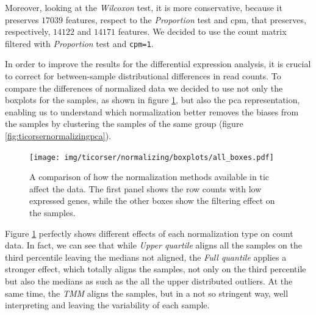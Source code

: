 Moreover, looking at the \textit{Wilcoxon} test, it is more conservative, because it preserves $17039$ features, respect to the \textit{Proportion} test and \gls{cpm}, that preserves, respectively, $14122$ and $14171$ features.
We decided to use the count matrix filtered with \textit{Proportion} test and \lstinline!cpm=1!.  

In order to improve the results for the differential expression analysis, it is crucial to correct for between-sample distributional differences in read counts.
To compare the differences of normalized data we decided to use not only the boxplots for the samples, as shown in  figure \ref{fig:ticorsernormalizingbox}, but also the \gls{pca} representation, enabling us to understand which normalization better removes the biases from the samples by clustering the samples of the same group (figure \ref{fig:ticorsernormalizingpca}).

\begin{figure}[H]
\texttt{[image: img/ticorser/normalizing/boxplots/all\_boxes.pdf]}
\caption[ticorser normalizing boxplots]{A comparison of how the normalization methods available in \gls{tic} affect the data.
The first panel shows the row counts with low expressed genes, while the other boxes show the filtering effect on the samples.}
\label{fig:ticorsernormalizingbox}
\centering
\end{figure}

Figure \ref{fig:ticorsernormalizingbox} perfectly shows different effects of each normalization type on count data.  
In fact, we can see that while \textit{Upper quartile} aligns all the samples on the third percentile leaving the medians not aligned, the \textit{Full quantile} applies a stronger effect, which totally aligns the samples, not only on the third percentile but also the medians as such as the all the upper distributed outliers.
At the same time, the \textit{TMM} aligns the samples, but in a not so stringent way, well interpreting and leaving the variability of each sample.

